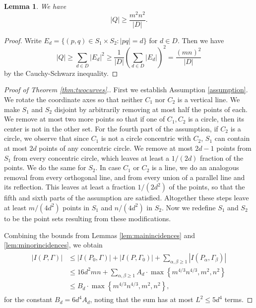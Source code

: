 \documentclass[12pt]{article}
\newtheorem{lemma}[theorem]{Lemma}
\begin{document}
 \begin{lemma}\label{lem:quads}
 We have
   $$|Q| \geq \frac{m^2n^2}{|D|}.$$
 \end{lemma}
 \begin{proof}
  Write $E_d = \{(p,q)\in S_1\times S_2: |pq| = d\}$ for $d\in D$.  
  Then we have
  $$|Q|\geq \sum_{d\in D} |E_d|^2
  \geq \frac{1}{|D|} \left( \sum_{d\in D} |E_d|   \right)^2 = \frac{(mn)^2}{|D|}$$%
  by the Cauchy-Schwarz inequality.
 \end{proof}

 
\begin{proof}[Proof of Theorem \ref{thm:twocurves}.]
 First we establish Assumption \ref{assumption}.
 We rotate the coordinate axes so that neither $C_1$ nor $C_2$ is a vertical line.
 We make $S_1$ and $S_2$ disjoint by arbitrarily removing at most half the points of each.
 We remove at most two more points so that if one of $C_1,C_2$ is a circle, then its center is not in the other set.
 For the fourth part of the assumption, if $C_2$ is a circle,
 we observe that since $C_1$ is not a circle concentric with $C_2$, 
 $S_1$ can contain at most $2d$ points of any concentric circle.
 We remove at most $2d-1$ points from $S_1$ from every concentric circle,
 which leaves at least a $1/(2d)$ fraction of the points.
 We do the same for $S_2$.
 In case $C_1$ or $C_2$ is a line,
 we do an analogous removal from every orthogonal line,
 and from every union of a parallel line and its reflection.
 This leaves at least a fraction $1/(2d^2)$ of the points,
 so that the fifth and sixth parts of the assumption are satisfied.
 Altogether these steps leave at least $m/(4d^2)$ points in $S_1$ and $n/(4d^2)$ in $S_2$.
 Now we redefine $S_1$ and $S_2$ to be the point sets resulting from these modifications.

 Combining the bounds from Lemmas \ref{lem:mainincidences} and \ref{lem:minorincidences}, we obtain
 \begin{align*}
  \begin{split}
|I(P,\Gamma)| &\leq |I(P_0, \Gamma)| + |I(P,\Gamma_0)| + \sum_{\alpha,\beta\geq 1} |I(P_\alpha,\Gamma_\beta)| \\
   & \leq 16d^2mn +\sum_{\alpha,\beta\geq 1} A_d\cdot \max\left\{m^{4/3}n^{4/3}, m^2, n^2\right\} \\
   &\leq B_d \cdot \max\left\{ m^{4/3}n^{4/3}, m^2, n^2\right\},
  \end{split}
 \end{align*}
 for the constant $B_d = 6d^4 A_d$, noting that the sum has at most $L^2 \leq 5d^4$ terms.


\end{proof}
\end{document}
